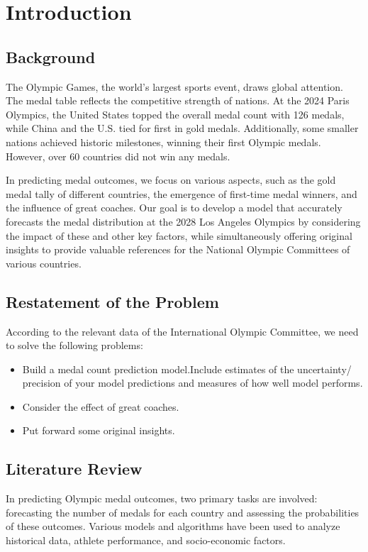 \documentclass{mcmthesis}
\begin{document}
\section{Introduction}

\subsection{Background}

The Olympic Games, the world's largest sports event, draws global attention. The medal table reflects the competitive strength of nations. At the 2024 Paris Olympics, the United States topped the overall medal count with 126 medals, while China and the U.S. tied for first in gold medals. Additionally, some smaller nations achieved historic milestones, winning their first Olympic medals. However, over 60 countries did not win any medals.
  
  In predicting medal outcomes, we focus on various aspects, such as the gold medal tally of different countries, the emergence of first-time medal winners, and the influence of great coaches. Our goal is to develop a model that accurately forecasts the medal distribution at the 2028 Los Angeles Olympics by considering the impact of these and other key factors, while simultaneously offering original insights to provide valuable references for the National Olympic Committees of various countries.
\subsection{Restatement of the Problem}
According to the relevant data of the International Olympic Committee, we need to solve the following problems:
\begin{itemize}
\item Build a medal count prediction model.Include estimates of the uncertainty/ precision of your model predictions and measures of how well model performs.
\item Consider the effect of great coaches.
\item Put forward some original insights.
\end{itemize}

\subsection{Literature Review}

In predicting Olympic medal outcomes, two primary tasks are involved: forecasting the number of medals for each country and assessing the probabilities of these outcomes. Various models and algorithms have been used to analyze historical data, athlete performance, and socio-economic factors.
\end{document}
